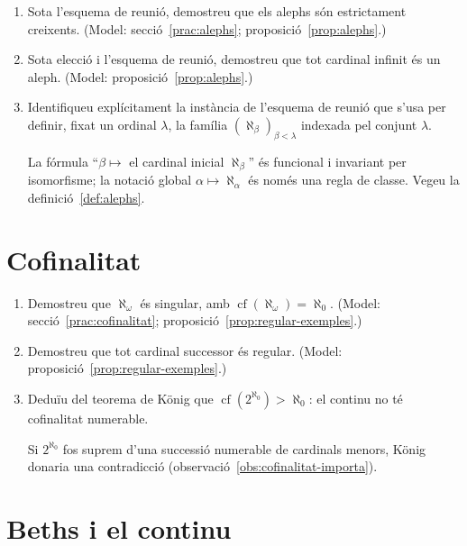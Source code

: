 \begin{enumerate}[resume]
  \item Sota l'esquema de reunió, demostreu que els alephs són estrictament creixents. (Model: secció~\ref{prac:alephs}; proposició~\ref{prop:alephs}.)

  \item Sota elecció i l'esquema de reunió, demostreu que tot cardinal infinit és un aleph. (Model: proposició~\ref{prop:alephs}.)

  \item Identifiqueu explícitament la instància de l'esquema de reunió que s'usa per definir, fixat un ordinal \(\lambda\), la família \((\aleph_\beta)_{\beta<\lambda}\) indexada pel conjunt \(\lambda\). \begin{indicacio}La fórmula \enquote{\(\beta\mapsto\) el cardinal inicial \(\aleph_\beta\)} és funcional i invariant per isomorfisme; la notació global \(\alpha\mapsto\aleph_\alpha\) és només una regla de classe. Vegeu la definició~\ref{def:alephs}.\end{indicacio}
\end{enumerate}

\section{Cofinalitat}

\begin{enumerate}[resume]
  \item Demostreu que \(\aleph_\omega\) és singular, amb \(\operatorname{cf}(\aleph_\omega)=\aleph_0\). (Model: secció~\ref{prac:cofinalitat}; proposició~\ref{prop:regular-exemples}.)

  \item Demostreu que tot cardinal successor és regular. (Model: proposició~\ref{prop:regular-exemples}.)

  \item Deduïu del teorema de König que \(\operatorname{cf}(2^{\aleph_0})>\aleph_0\): el continu no té cofinalitat numerable. \begin{indicacio}Si \(2^{\aleph_0}\) fos suprem d'una successió numerable de cardinals menors, König donaria una contradicció (observació~\ref{obs:cofinalitat-importa}).\end{indicacio}
\end{enumerate}

\section{Beths i el continu}

